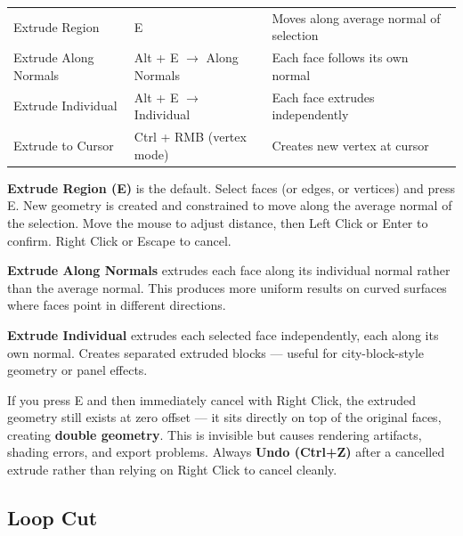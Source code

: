 \begin{shortcutbox}
\begin{center}
\begin{tabularx}{\textwidth}{L{4cm}C{3.5cm}X}
\toprule
{}
 &  &  \\
\midrule
Extrude Region & E & Moves along average normal of selection \\
Extrude Along Normals & Alt + E $\rightarrow$ Along Normals & Each face follows its own normal \\
Extrude Individual & Alt + E $\rightarrow$ Individual & Each face extrudes independently \\
Extrude to Cursor & Ctrl + RMB (vertex mode) & Creates new vertex at cursor \\
\bottomrule
\end{tabularx}
\end{center}
\end{shortcutbox}

\textbf{Extrude Region (E)} is the default. Select faces (or edges, or vertices) and press E. New geometry is created and constrained to move along the average normal of the selection. Move the mouse to adjust distance, then Left Click or Enter to confirm. Right Click or Escape to cancel.

\textbf{Extrude Along Normals} extrudes each face along its individual normal rather than the average normal. This produces more uniform results on curved surfaces where faces point in different directions.

\textbf{Extrude Individual} extrudes each selected face independently, each along its own normal. Creates separated extruded blocks --- useful for city-block-style geometry or panel effects.

\begin{warningbox}
If you press E and then immediately cancel with Right Click, the extruded geometry still exists at zero offset --- it sits directly on top of the original faces, creating \textbf{double geometry}. This is invisible but causes rendering artifacts, shading errors, and export problems. Always \textbf{Undo (Ctrl+Z)} after a cancelled extrude rather than relying on Right Click to cancel cleanly.
\end{warningbox}

\subsection{Loop Cut}
\label{sec:loopcut}

